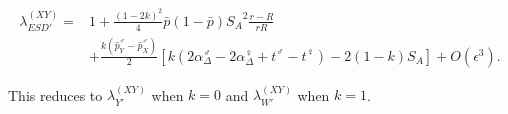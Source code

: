 \documentclass[10pt,letterpaper]{article}
\providecommand{\DIFaddbegin}{} %
\providecommand{\DIFaddend}{} %
\providecommand{\DIFdelbegin}{} %
\providecommand{\DIFdelend}{} %
\begin{document}
\begin{equation}
\DIFdelbegin %
\DIFdelend \DIFaddbegin \begin{split}
\lambda_{ESD'}^{(XY)} =& 1 + \frac{{(1-2k)}^2}{4}\bar{p}(1-\bar{p}){S_{A}}^2\frac{r-R}{r R} \\
&+\frac{k(\hat{p}^\male_Y-\hat{p}^\male_X)}{2}\left[ k \left(2\alpha_{\Delta}^\male-2\alpha_{\Delta}^\female+t^\male-t^\female \right) -2(1-k)S_{A}\right]+O\left(\epsilon^3\right).
\end{split}
\DIFaddend \label{eq:lambda_ESD_k}
\end{equation}

\noindent
This reduces to $\lambda_{Y'}^{(XY)}$ when $k=0$ and $\lambda_{W'}^{(XY)}$ when $k=1$. 
\end{document}
